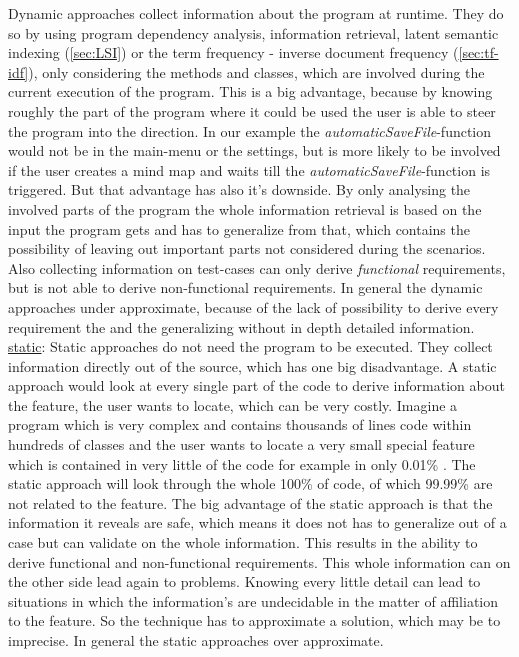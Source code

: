 Dynamic approaches collect information about the program at runtime. They do so by using program dependency analysis, information retrieval, latent semantic indexing (\autoref{sec:LSI}) or the term frequency - inverse document frequency {(\autoref{sec:tf-idf}), only considering the methods and classes, which are involved during the current execution of the program. This is a big advantage, because by knowing roughly the part of the program where it could be used the user is able to steer the program into the direction. In our example the \emph{automaticSaveFile}-function would not be in the main-menu or the settings, but is more likely to be involved if the user creates a mind map and waits till the \emph{automaticSaveFile}-function is triggered. But that advantage has also it's downside. By only analysing the involved parts of the program the whole information retrieval is based on the input the program gets and has to generalize from that, which contains the possibility of leaving out important parts not considered during the scenarios. Also collecting information on test-cases can only derive \emph{functional} requirements, but is not able to derive non-functional requirements. In general the dynamic approaches under approximate, because of the lack of possibility to derive every requirement the and the generalizing without in depth detailed information.\newline
\underline{static}:\newline
Static approaches do not need the program to be executed. They collect information directly out of the source, which has  one big disadvantage. A static approach would look at every single part of the code to derive information about the feature, the user wants to locate, which can be very costly. Imagine a program which is very complex and contains thousands of lines code within hundreds of classes and the user wants to locate a very small special feature which is contained in very little of the code for example in only 0.01\% . The static approach will look through the whole 100\% of code, of which 99.99\% are not related to the feature. The big advantage of the static approach is that the information it reveals are safe, which means it does not has to generalize out of a case but can validate on the whole information. This results in the ability to derive functional and non-functional requirements. This whole information can on the other side lead again to problems. Knowing every little detail can lead to situations in which the information's are undecidable in the matter of affiliation to the feature. So the technique has to approximate a solution, which may be to imprecise. In general the static approaches over approximate. \newline
}

